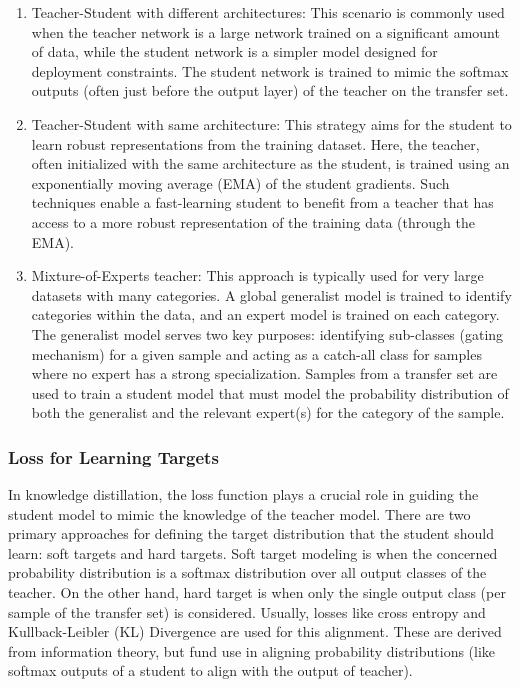 \begin{enumerate}
    \item Teacher-Student with different architectures: This scenario
        is commonly used when the teacher network is a large network
        trained on a significant amount of data, while the student
        network is a simpler model designed for deployment
        constraints. The student network is trained to mimic the
        softmax outputs (often just before the output layer) of the
        teacher on the transfer set.
    \item Teacher-Student with same architecture: This strategy aims
        for the student to learn robust representations from the
        training dataset.  Here, the teacher, often initialized with
        the same architecture as the student, is trained using an
        exponentially moving average (EMA) of the student gradients.
        Such techniques enable a fast-learning student to benefit from
        a teacher that has access to a more robust representation of
        the training data (through the EMA).
    \item Mixture-of-Experts teacher: This approach is typically used
        for very large datasets with many categories. A global
        generalist model is trained to identify categories within the
        data, and an expert model is trained on each category. The
        generalist model serves two key purposes: identifying
        sub-classes (gating mechanism) for a given sample and acting
        as a catch-all class for samples where no expert has a strong
        specialization. Samples from a transfer set are used to train
        a student model that must model the probability distribution
        of both the generalist and the relevant expert(s) for the
        category of the sample.
\end{enumerate}

\subsubsection{Loss for Learning Targets}

In knowledge distillation, the loss function plays a crucial role in
guiding the student model to mimic the knowledge of the teacher model.
There are two primary approaches for defining the target distribution
that the student should learn: soft targets and hard targets. Soft
target modeling is when the concerned probability distribution is a
softmax distribution over all output classes of the teacher. On the
other hand, hard target is when only the single output class (per
sample of the transfer set) is considered. Usually, losses like cross
entropy and Kullback-Leibler (KL) Divergence are used for this
alignment. These are derived from information theory, but fund use in
aligning probability distributions (like softmax outputs of a student
to align with the output of teacher).

